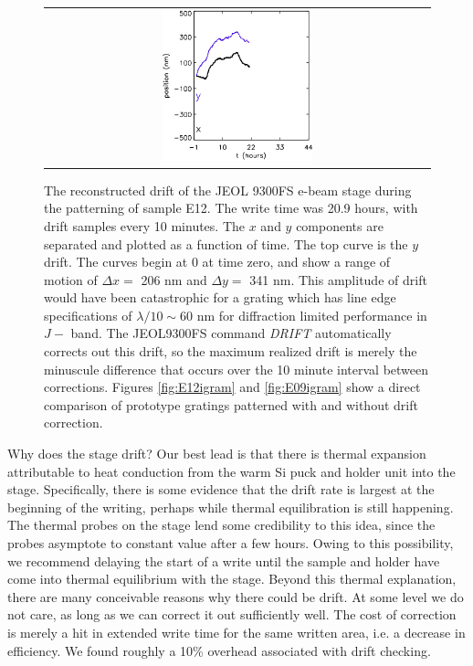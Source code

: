 \documentclass[]{spie}  %
\begin{document}
\begin{figure}
\begin{center}
 \begin{tabular}{c}
    \includegraphics[width=0.4\textwidth]{figs/E12_drift_ebeam.png}
   \end{tabular}
  \end{center}
  \caption[Drift amplitude]{\label{fig:ebeamDrift} The reconstructed drift of the JEOL 9300FS e-beam stage during the patterning of sample E12.  The write time was 20.9 hours, with drift samples every 10 minutes.  The $x$ and $y$ components are separated and plotted as a function of time.  The top curve is the $y$ drift.  The curves begin at 0 at time zero, and show a range of motion of $\Delta x = $ 206 nm and $\Delta y = $ 341 nm.  This amplitude of drift would have been catastrophic for a grating which has line edge specifications of $\lambda/10 \sim 60 $ nm for diffraction limited performance in $J-$ band.  The JEOL9300FS command \emph{DRIFT} automatically corrects out this drift, so the maximum realized drift is merely the minuscule difference that occurs over the 10 minute interval between corrections.  Figures \ref{fig:E12igram} and \ref{fig:E09igram} show a direct comparison of prototype gratings patterned with and without drift correction.}
\end{figure}

Why does the stage drift?  Our best lead is that there is thermal expansion attributable to heat conduction from the warm Si puck and holder unit into the stage.  Specifically, there is some evidence that the drift rate is largest at the beginning of the writing, perhaps while thermal equilibration is still happening.  The thermal probes on the stage lend some credibility to this idea, since the probes asymptote to constant value after a few hours.  Owing to this possibility, we recommend delaying the start of a write until the sample and holder have come into thermal equilibrium with the stage.  Beyond this thermal explanation, there are many conceivable reasons why there could be drift.  At some level we do not care, as long as we can correct it out sufficiently well.  The cost of correction is merely a hit in extended write time for the same written area, i.e. a decrease in efficiency.  We found roughly a 10\% overhead associated with drift checking.
\end{document}
